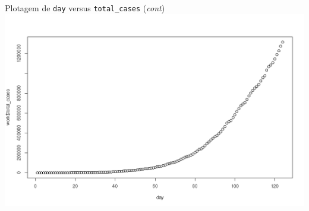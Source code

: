 \documentclass[a4paper,10pt]{beamer}
\begin{document}
\begin{frame}{ Plotagem de {\tt day} versus {\tt total\_cases} ({\em cont}) }
  \includegraphics[scale=0.375]{plot-dayXtotal_cases.png}

\end{frame}

%   
%   
% 

%   
\end{document}

